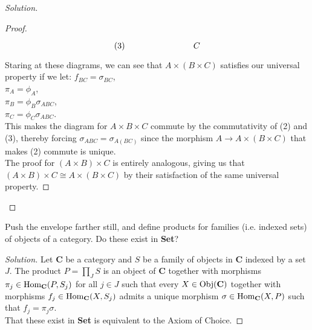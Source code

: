 \documentclass[12pt]{article}
\newenvironment{problem}[2][Problem]{\begin{trivlist}
\item[\hskip \labelsep {\bfseries #1}\hskip \labelsep {\bfseries #2.}]}{\end{trivlist}}
\newcommand{\catname}[1]{\normalfont\textbf{#1}}
\newcommand{\Hom}{\text{Hom}}
\newcommand{\Homc}[2]{\Hom_{\catname{#1}}(#2)}
\newcommand{\Objc}[1]{\text{Obj}(\catname{#1})}
\newenvironment{solution}
  {\renewcommand\qedsymbol{$\blacksquare$}\begin{proof}[Solution]}
{\end{proof}}
\begin{document}
\begin{solution}
\begin{proof}
\[\begin{tikzcd}{(3)}
    &&&C
  \end{tikzcd}\]
  Staring at these diagrams,
  we can see that 
  $A\times (B\times C)$ satisfies our universal property if we let:
  $f_{BC} = \sigma_{BC}$,\\
  $\pi_A = \phi_A$,\\
  $\pi_B = \phi_B\sigma_{ABC}$, \\
  $\pi_C = \phi_C\sigma_{ABC}$.\\
  This makes the diagram for 
  $A\times B\times C$ commute by the commutativity of (2) and (3), 
  thereby forcing $\sigma_{ABC}=\sigma_{A(BC)}$ since the morphism
  $A\to A\times (B\times C)$ that makes (2) commute is unique.\\
  The proof for $(A\times B)\times C$ is entirely analogous, 
  giving us that $(A\times B)\times C \cong A\times (B\times C)$ by their
  satisfaction of the same universal property.
\end{proof}
\end{solution}
\begin{problem}{5.10}
  Push the envelope farther still, and define products for families (i.e. indexed sets) of objects of a category. Do these exist in \catname{Set}?
\end{problem}
\begin{solution}
  Let \catname{C} be a category and $S$ be a family of objects in \catname{C} indexed by a set $J$. 
  The product $P=\prod_J S$
  is an object of \catname{C} together with morphisms 
  $\pi_j \in \Homc{C}{P,S_j}$ for all $j\in J$ such that
  every $X\in\Objc{C}$ together with morphisms 
  $f_j\in\Homc{C}{X,S_j}$ admits a unique morphism
  $\sigma\in\Homc{C}{X,P}$ such that
  $f_j = \pi_j\sigma$.\\
  That these exist in \catname{Set} is equivalent to the Axiom of Choice.

\end{solution}
\end{document}
